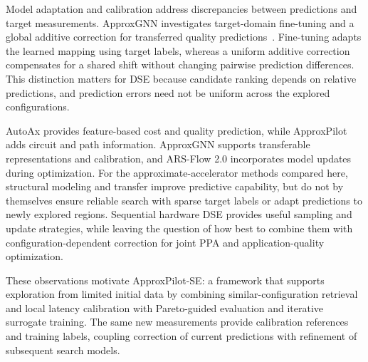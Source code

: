 Model adaptation and calibration address discrepancies between predictions and target measurements.
ApproxGNN investigates target-domain fine-tuning and a global additive correction for transferred quality predictions~\cite{vlcek2025approxgnn}.
Fine-tuning adapts the learned mapping using target labels, whereas a uniform additive correction compensates for a shared shift without changing pairwise prediction differences.
This distinction matters for DSE because candidate ranking depends on relative predictions, and prediction errors need not be uniform across the explored configurations.

AutoAx provides feature-based cost and quality prediction, while ApproxPilot adds circuit and path information. ApproxGNN supports transferable representations and calibration, and ARS-Flow 2.0 incorporates model updates during optimization.
For the approximate-accelerator methods compared here, structural modeling and transfer improve predictive capability, but do not by themselves ensure reliable search with sparse target labels or adapt predictions to newly explored regions.
Sequential hardware DSE provides useful sampling and update strategies, while leaving the question of how best to combine them with configuration-dependent correction for joint PPA and application-quality optimization.

These observations motivate ApproxPilot-SE: a framework that supports exploration from limited initial data by combining similar-configuration retrieval and local latency calibration with Pareto-guided evaluation and iterative surrogate training.
The same new measurements provide calibration references and training labels, coupling correction of current predictions with refinement of subsequent search models.
